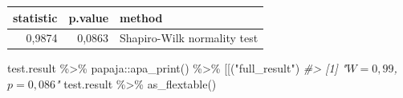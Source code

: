 \documentclass[
]{book}
\newenvironment{Shaded}{\begin{snugshade}}{\end{snugshade}}
\newcommand{\AttributeTok}[1]{\textcolor[rgb]{0.77,0.63,0.00}{#1}}
\newcommand{\CommentTok}[1]{\textcolor[rgb]{0.56,0.35,0.01}{\textit{#1}}}
\newcommand{\FunctionTok}[1]{\textcolor[rgb]{0.00,0.00,0.00}{#1}}
\newcommand{\NormalTok}[1]{#1}
\newcommand{\OtherTok}[1]{\textcolor[rgb]{0.56,0.35,0.01}{#1}}
\newcommand{\SpecialCharTok}[1]{\textcolor[rgb]{0.00,0.00,0.00}{#1}}
\newcommand{\StringTok}[1]{\textcolor[rgb]{0.31,0.60,0.02}{#1}}
\begin{document}
\begin{Shaded}
\end{Shaded}

\begin{tabular}{r|r|l}
\hline
statistic & p.value & method\\
\hline
0,9874 & 0,0863 & Shapiro-Wilk normality test\\
\hline
\end{tabular}

\begin{Shaded}
\begin{Highlighting}[]
\NormalTok{test.result }\SpecialCharTok{\%\textgreater{}\%}\NormalTok{ papaja}\SpecialCharTok{::}\FunctionTok{apa\_print}\NormalTok{() }\SpecialCharTok{\%\textgreater{}\%} \StringTok{\textasciigrave{}}\AttributeTok{[[}\StringTok{\textasciigrave{}}\NormalTok{(}\StringTok{"full\_result"}\NormalTok{)}
\CommentTok{\#\textgreater{} [1] "$W = 0,99$, $p = 0,086$"}
\NormalTok{test.result }\SpecialCharTok{\%\textgreater{}\%} \FunctionTok{as\_flextable}\NormalTok{()}
\end{Highlighting}
\end{Shaded}

\providecommand{\docline}[3]{\noalign{\global\setlength{\arrayrulewidth}{#1}}\arrayrulecolor[HTML]{#2}\cline{#3}}

\setlength{\tabcolsep}{2pt}

\renewcommand*{\arraystretch}{1.5}
\end{document}
